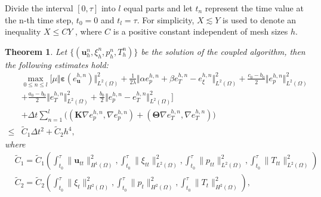 \documentclass{article}
\newtheorem{theorem}{Theorem}[section]
\numberwithin{equation}{section}
\begin{document}
Divide the interval \([0, \tau]\) into \(l\) equal parts and let \(t_n\) represent the time value at the n-th time step, \(t_0=0\) and \(t_l=\tau\). For
simplicity, \(X\lesssim Y\) is used to denote an inequality \(X \le CY\) , where \(C\) is a positive constant independent of mesh sizes \(h\).%
\begin{theorem}\label{euhn estimate}
 Let $\{(\bm u_h^n, \xi_h^n,p_h^n, T_h^n)\}$ be the solution of  the coupled algorithm, then the following
 estimates hold:
\begin{equation}\label{max Enl + ehn le Dt^2 H^4}
\begin{aligned} 
& \max_{0\le n\le l}\Big[
   \mu\Vert\bm\varepsilon(e_{\bm u}^{h,n})\Vert_{L^2(\Omega)}^2  
  +\frac1{2\lambda} \Vert\alpha  e_p^{h,n}+\beta  e_T^{h,n}- e_\xi^{h,n}\Vert_{L^2(\Omega)}^2
  +\frac{c_0-b_0}{2} \Vert  e_p^{h,n}\Vert_{L^2(\Omega)}^2  \\
 & +\frac{a_0-b_0}{2} \Vert  e_T^{h,n}\Vert_{L^2(\Omega)}^2 
  +\frac{b_0}{2} \Vert  e_p^{h,n}- e_T^{h,n}\Vert_{L^2(\Omega)}^2
                   \Big] \\
                   &+  \Delta t \sum_{n=1}^l \big(  (\bm K\nabla e_p^{h,n},\nabla  e_p^{h,n})
                              +  (\bm\Theta\nabla e_T^{h,n},\nabla  e_T^{h,n})  \big)\\
\le &  \tilde C_1\Delta t^2 + \tilde C_2 h^4,             
\end{aligned}
\end{equation} 
 where
 \begin{equation}  
\begin{aligned} 
&  \tilde C_1   =\tilde C_1(  \int_{t_0}^{\tau}\| \bm u_{tt}  \|_{H^1(\Omega)}^2,
              \int_{t_0}^{\tau}\| \xi_{tt}  \|_{L^2(\Omega)}^2,
              \int_{t_0}^{\tau}\| p_{tt}  \|_{L^2(\Omega)}^2,
            \int_{t_0}^{\tau}\| T_{tt}  \|_{L^2(\Omega)}^2)\\ 
&  \tilde C_2   =\tilde C_2 ( \int_{t_0}^{\tau}\| \xi_t  \|_{H^2(\Omega)}^2 ,
           \int_{t_0}^{\tau}\| p_t  \|_{H^2(\Omega)}^2, 
             \int_{t_0}^{\tau}\| T_t  \|_{H^2(\Omega)}^2),             
\end{aligned}
\end{equation} 
\end{theorem}
\end{document}

